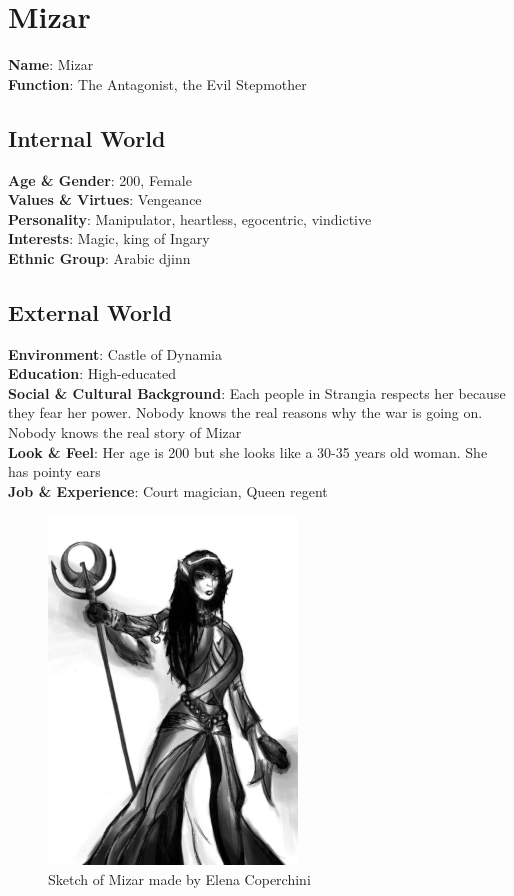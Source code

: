 \section{Mizar}

\begin{minipage}{0.5\textwidth}
\textbf{Name}: Mizar\\
\textbf{Function}: The Antagonist, the Evil Stepmother

\subsection{Internal World}

\textbf{Age \& Gender}: 200, Female \\
\textbf{Values \& Virtues}: Vengeance \\
\textbf{Personality}: Manipulator, heartless, egocentric, vindictive \\
\textbf{Interests}: Magic, king of Ingary \\
\textbf{Ethnic Group}: Arabic djinn

\subsection{External World}
\textbf{Environment}: Castle of Dynamia \\
\textbf{Education}: High-educated \\
\textbf{Social \& Cultural Background}: Each people in Strangia respects her because they fear her power. Nobody knows the real reasons why the war is going on. Nobody knows the real story of Mizar \\
\textbf{Look \& Feel}: Her age is 200 but she looks like a 30-35 years old woman. She has pointy ears  \\
\textbf{Job \& Experience}: Court magician, Queen regent \\

\end{minipage}%
%
\hfill\begin{minipage}{0.4\textwidth}
  \begin{figure}[H]
  \includegraphics{Images/Characters/mizar}
  \caption{Sketch of Mizar made by Elena Coperchini}
\end{figure}
\end{minipage}


